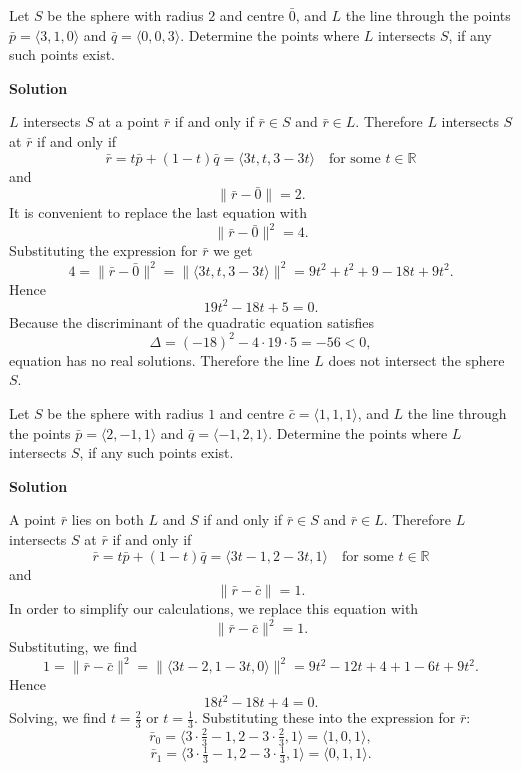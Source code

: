 
\begin{examplebox}
Let $S$ be the sphere with radius $2$ and centre $\bar{0}$, and $L$ the line through the points $\bar{p} = \langle 3, 1, 0 \rangle$ and $\bar{q} = \langle 0, 0, 3 \rangle$. Determine the points where $L$ intersects $S$, if any such points exist.
\vspace{1em}

\textbf{Solution}
\vspace{1em}

$L$ intersects $S$ at a point $\bar{r}$ if and only if $\bar{r} \in S$ and $\bar{r} \in L$. Therefore $L$ intersects $S$ at $\bar{r}$ if and only if
\[
\bar{r} = t\bar{p} + (1 - t)\bar{q} = \langle 3t, t, 3 - 3t \rangle \quad \text{for some } t \in \mathbb{R}
\]
and
\[
\|\bar{r} - \bar{0}\| = 2.
\]
It is convenient to replace the last equation with
\[
\|\bar{r} - \bar{0}\|^2 = 4.
\]
Substituting the expression for $\bar{r}$ we get
\[
4 = \|\bar{r} - \bar{0}\|^2 = \| \langle 3t, t, 3 - 3t \rangle \|^2 = 9t^2 + t^2 + 9 - 18t + 9t^2.
\]
Hence
\[
19t^2 - 18t + 5 = 0.
\]
Because the discriminant of the quadratic equation satisfies
\[
\Delta = (-18)^2 - 4 \cdot 19 \cdot 5 = -56 < 0,
\]
equation has no real solutions. Therefore the line $L$ does not intersect the sphere $S$.
\end{examplebox}

\begin{examplebox}
Let $S$ be the sphere with radius $1$ and centre $\bar{c} = \langle 1, 1, 1 \rangle$, and $L$ the line through the points $\bar{p} = \langle 2, -1, 1 \rangle$ and $\bar{q} = \langle -1, 2, 1 \rangle$. Determine the points where $L$ intersects $S$, if any such points exist.
\vspace{1em}

\textbf{Solution}
\vspace{1em}

A point $\bar{r}$ lies on both $L$ and $S$ if and only if $\bar{r} \in S$ and $\bar{r} \in L$. Therefore $L$ intersects $S$ at $\bar{r}$ if and only if
\[
\bar{r} = t\bar{p} + (1 - t)\bar{q} = \langle 3t - 1, 2 - 3t, 1 \rangle \quad \text{for some } t \in \mathbb{R}
\]
and
\[
\|\bar{r} - \bar{c}\| = 1.
\]
In order to simplify our calculations, we replace this equation with
\[
\|\bar{r} - \bar{c}\|^2 = 1.
\]
Substituting, we find
\[
1 = \| \bar{r} - \bar{c} \|^2 = \| \langle 3t - 2, 1 - 3t, 0 \rangle \|^2 = 9t^2 - 12t + 4 + 1 - 6t + 9t^2.
\]
Hence
\[
18t^2 - 18t + 4 = 0.
\]
Solving, we find $t = \frac{2}{3}$ or $t = \frac{1}{3}$. Substituting these into the expression for $\bar{r}$:
\[
\bar{r}_0 = \langle 3 \cdot \tfrac{2}{3} - 1, 2 - 3 \cdot \tfrac{2}{3}, 1 \rangle = \langle 1, 0, 1 \rangle,
\]
\[
\bar{r}_1 = \langle 3 \cdot \tfrac{1}{3} - 1, 2 - 3 \cdot \tfrac{1}{3}, 1 \rangle = \langle 0, 1, 1 \rangle.
\]
\end{examplebox}

